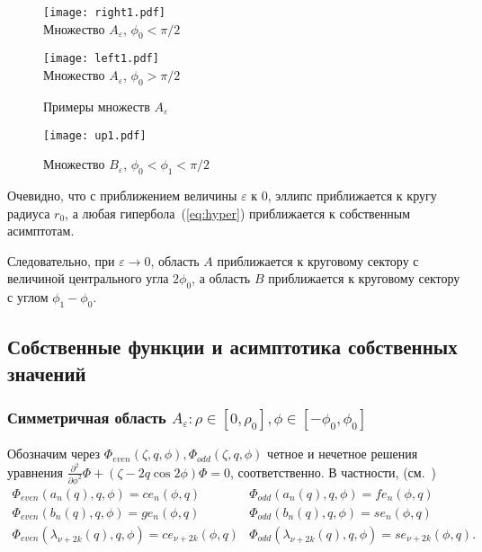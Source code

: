 \begin{figure}[ht]
    \begin{minipage}[b][][b]{0.49\linewidth}\centering
        \texttt{[image: right1.pdf]} \\ 
        Множество $A_\varepsilon$, $\phi_0<\pi/2$
    \end{minipage}
    \hfill
    \begin{minipage}[b][][b]{0.49\linewidth}\centering
        \texttt{[image: left1.pdf]} \\ 
        Множество $A_\varepsilon$, $\phi_0>\pi/2$
    \end{minipage}
\caption{Примеры множеств $A_\varepsilon$}
\end{figure}

\begin{figure}[ht]
\begin{minipage}{0.9\linewidth}\centering
        \texttt{[image: up1.pdf]}  
    \end{minipage}
\caption{        Множество $B_\varepsilon$, $\phi_0<\phi_1<\pi/2$}
\end{figure}

Очевидно, что с приближением величины $\varepsilon$ к 0, эллипс приближается к кругу радиуса $r_0$,
а любая гипербола~(\ref{eq:hyper}) приближается к собственным асимптотам.

Следовательно, при $\varepsilon\to 0$, область $A$ приближается к круговому сектору с величиной центрального угла $2\phi_0$, 
а область  $B$ приближается к круговому сектору с углом $\phi_1-\phi_0$. 


\subsection{Собственные функции и асимптотика собственных значений}\label{sec:ch2/sec4/subs2}
\subsubsection{Симметричная область $A_\varepsilon: \rho \in [0,\rho_0], \phi \in [-\phi_0,\phi_0]$}\label{sec:ch2/sec4/subs2/subs1}

Обозначим через $\Phi_{even}(\zeta, q, \phi), \Phi_{odd}(\zeta, q, \phi)$ четное и нечетное решения уравнения $\frac{\partial^2}{\partial \phi^2}\Phi + (\zeta - 2q\cos{2\phi})\Phi = 0$, соответственно. 
В частности, (см.~\cite{wref2})
\[
\begin{array}{ll}
    \Phi_{even}(a_n(q), q, \phi) = ce_n(\phi, q)	&
    \Phi_{odd}(a_n(q), q, \phi) = fe_n(\phi, q)\\
    \Phi_{even}(b_n(q), q, \phi) = ge_n(\phi, q)	&
    \Phi_{odd}(b_n(q), q, \phi) = se_n(\phi, q)\\
    \Phi_{even}(\lambda_{\nu+2k}(q), q, \phi) = ce_{\nu+2k}(\phi, q) 	&
    \Phi_{odd}(\lambda_{\nu+2k}(q), q, \phi) = se_{\nu+2k}(\phi, q).
\end{array}
\]

